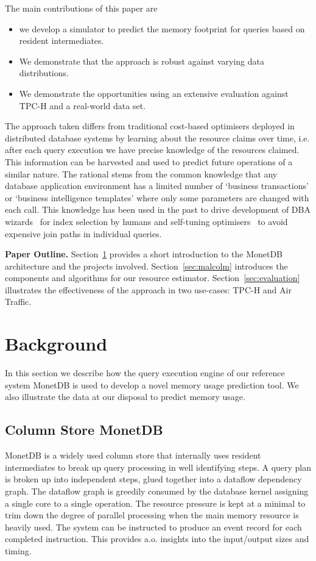 \documentclass[conference]{IEEEtran}
\def\Skip{\par\medskip\nobreak\noindent}
\begin{document}
The main contributions of this paper are
\begin{itemize}
	\item we develop a simulator to predict the memory footprint for queries based on resident intermediates.
	\item We demonstrate that the approach is robust against varying data distributions.
	\item We demonstrate the opportunities using an extensive evaluation against TPC-H and a real-world data set.
\end{itemize}

The approach taken differs from traditional cost-based optimisers deployed in distributed database systems by learning about the resource claims over time, i.e. after each query execution we have precise knowledge of the resources claimed.
This information can be harvested and used to predict future operations of a similar nature.
The rational stems from the common knowledge that any database application environment has a limited number of `business transactions' or `business intelligence templates' where only some parameters are changed with each call.
This knowledge has been used in the past to drive development of DBA wizards~\cite{ms_wizards} for index selection by humans and self-tuning optimisers~\cite{IBM} to avoid expensive join paths in individual queries.

\Skip
\textbf{Paper Outline.}
Section~\ref{sec:background} provides a short introduction to the MonetDB architecture and the projects involved.
Section~\ref{sec:malcolm} introduces the components and algorithms for our resource estimator.
Section~\ref{sec:evaluation} illustrates the effectiveness of the approach in two use-cases: TPC-H and Air Traffic.

\section{Background}
\label{sec:background} 
In this section we describe how the query execution engine of our reference system MonetDB is used to develop a novel memory usage prediction tool.
We also illustrate the data at our disposal to predict memory usage.

\subsection{Column Store MonetDB}
MonetDB is a widely used column store that internally uses resident intermediates to break up query processing in well identifying steps. 
A query plan is broken up into independent steps, glued together into a dataflow dependency graph.
The dataflow graph is greedily consumed by the database kernel assigning a single core to a single operation.
The resource pressure is kept at a minimal to trim down the degree of parallel processing when the main memory resource is heavily used.
The system can be instructed to produce an event record for each completed instruction.
This provides a.o. insights into the input/output sizes and timing. 
\end{document}
